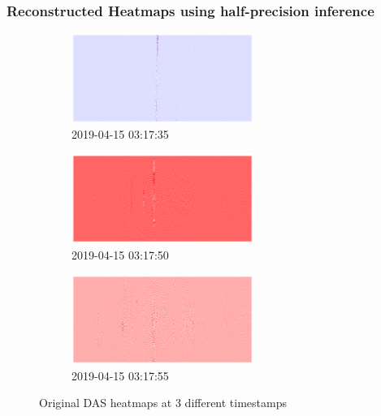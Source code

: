 \subsubsection{Reconstructed Heatmaps using half-precision inference}
\begin{figure}[!h]
\centering
\begin{subfigure}{\textwidth}
    \centering
    \includegraphics[width=0.65\textwidth]{figures/anomalies/before/20190415_031735.png}
    \caption{2019-04-15 03:17:35}
\end{subfigure}
\vspace{1em}
\begin{subfigure}{\textwidth}
    \centering
    \includegraphics[width=0.65\textwidth]{figures/anomalies/before/20190415_031750.png}
    \caption{2019-04-15 03:17:50}
\end{subfigure}
\vspace{1em}
\begin{subfigure}{\textwidth}
    \centering
    \includegraphics[width=0.65\textwidth]{figures/anomalies/before/20190415_031755.png}
    \caption{2019-04-15 03:17:55}
\end{subfigure}
\caption{Original DAS heatmaps at 3 different timestamps}
\label{fig:original_heatmaps}
\end{figure}
